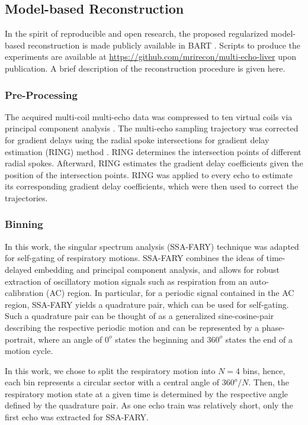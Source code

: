 \documentclass[journal,twoside,web]{ieeecolor}
\begin{document}
\subsection{Model-based Reconstruction}

In the spirit of reproducible and open research, 
the proposed regularized model-based reconstruction is made
publicly available in BART \cite{uecker_2015_bart}. 
Scripts to produce the experiments are available at \url{https://github.com/mrirecon/multi-echo-liver} upon publication. 
A brief description of the reconstruction procedure is given here.

\subsubsection*{Pre-Processing}

The acquired multi-coil multi-echo data was compressed to ten virtual coils 
via principal component analysis \cite{huang_2008_scc}. 
The multi-echo sampling trajectory 
was corrected for gradient delays using the
radial spoke intersections for gradient delay estimation (RING) method 
\cite{rosenzweig_2019_ring}. 
RING determines the intersection points of different radial spokes. 
Afterward, RING estimates the gradient delay coefficients 
given the position of the intersection points. 
RING was applied to every echo to estimate 
its corresponding gradient delay coefficients, 
which were then used to correct the trajectories.

\subsubsection*{Binning}

In this work, the singular spectrum analysis (SSA-FARY) technique 
\cite{rosenzweig_2020_ssa} 
was adapted for self-gating of respiratory motions. 
SSA-FARY combines the ideas of time-delayed embedding and principal component analysis, 
and allows for robust extraction of oscillatory motion signals 
such as respiration from an auto-calibration (AC) region. 
In particular, for a periodic signal contained in the AC region, 
SSA-FARY yields a quadrature pair, which can be used for self-gating. 
Such a quadrature pair can be thought of as a generalized sine-cosine-pair 
describing the respective periodic motion and can be represented by a phase-portrait, 
where an angle of $0^o$ states the beginning and $360^o$ states the end of a motion cycle. 

In this work, we chose to split the respiratory motion into $N = 4$ bins, 
hence, each bin represents a circular sector with a central angle of $360^o / N$. 
Then, the respiratory motion state at a given time is determined by 
the respective angle defined by the quadrature pair.
As one echo train was relatively short, 
only the first echo was extracted for SSA-FARY.
\end{document}
